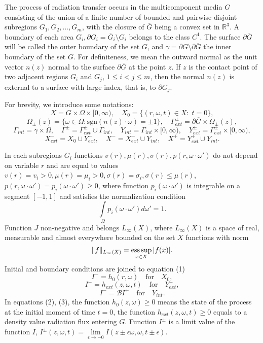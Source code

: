 \documentclass[12pt,reqno]{report}
\def\sgn{\mathrm{sgn}}
\begin{document}
The process of radiation transfer occurs in the multicomponent media $G$ 
consisting of the union of a finite number of bounded and pairwise disjoint subregions $G_1, G_2, ..., G_m$, with the closure of $\overline{G} $ being a convex set in $\mathbb{R}^3 $. A boundary of each area $G_i, \partial G_i = \overline{G} _i \setminus G_i$ belongs to the class $C^1$. The surface $\partial \overline{G} $ will be called the outer boundary of the set $G$, and $\gamma = \partial G \setminus \partial \overline{G} $ the inner boundary of the set $G$. For definiteness, we mean the outward normal as the  unit vector $n(z)$ 
normal
to the surface $\partial \overline{G}$ at the point $z$. If $z$ is the contact point of two adjacent regions $G_i$ and $G_j$, $ 1 \leq i < j \leq m $, then the normal $n(z)$ is external to a surface with large index, that is, to $\partial{G_j} $.

For brevity, we introduce some notations:
$$
X=G\times \Omega \times [0,\infty), \quad X_0=\{(r,\omega,t)\in
X:\; t=0 \}, 
$$
$$
\Omega_{\pm}(z)= \{ \omega \in \Omega : \sgn (n(z) \cdot
\omega)=\pm 1\}, \quad \Gamma^{\pm}_{ext} =
\partial \overline{G} \times \Omega_{\pm}(z), 
$$
$$
 \Gamma_{int}=\gamma \times \Omega, \quad
\Gamma^{\pm}=\Gamma^{\pm}_{ext}\cup \Gamma_{int},
\quad
Y_{int}=\Gamma_{int}\times[0,\infty), \quad
Y^{\pm}_{ext}=\Gamma^{\pm}_{ext}\times [0,\infty), 
$$
$$
X^{-}_{ext}=X_0 \cup Y^{-}_{ext}, \quad  X^{-}=X^{-}_{ext}\cup Y_{int},
\quad X^{+}=Y^{+}_{ext}\cup Y_{int}.
$$

In each subregions $G_i$ functions $v(r),\mu(r), \sigma(r),
p(r,\omega \cdot \omega')$ do not depend on variable $r$ and
are equal to  values $v(r)=v_i>0, \mu(r)=\mu_i > 0,
\sigma(r)=\sigma_i, \sigma(r) \leq \mu(r)$, $p(r,\omega \cdot
\omega')=p_i(\omega \cdot \omega') \geq 0$, where function
$p_i(\omega \cdot \omega')$ is integrable on a segment $[-1,1]$ 
and satisfies the normalization condition
$$
\int \limits_{\Omega} p_i(\omega \cdot \omega') d\omega'=1.
$$
Function $J$ non-negative and belongs $L_{\infty}(X)$, where
$L_{\infty}(X)$ is a space of real, measurable and almost everywhere bounded on the set $X$ functions
with norm
$$
\|f\|_{L_{\infty}(X)}=
\mathop{\fam0 ess\,sup} \limits_{x \in X} |f(x)|.
$$
Initial and boundary conditions are joined to equation (1)
\begin{equation}
I^- =h_0(r,\omega) \quad \text{for} \quad X_0,
\end{equation}
\begin{equation}
I^-= h_{ext}(z,\omega,t) \quad \text{for} \quad Y^-_{ext},
\end{equation}
\begin{equation}
I^-=\mathcal BI^+ \quad \text{for}\quad Y_{int}.
\end{equation}
In equations (2), (3), the function $h_0(z,\omega)\geq 0$
means the state of the process at the initial moment of time $t = 0$,
the function $h_{ext}(z,\omega,t) \geq 0 $ equals to a density value
radiation flux entering $G$. Function $I^{\pm}$ is a limit value of the function
$I$, $I^{\pm}(z,\omega,t)= \lim
\limits_{\epsilon \to -0} I(z \pm \epsilon \omega, \omega,t \pm
\epsilon)$. 
\end{document}
